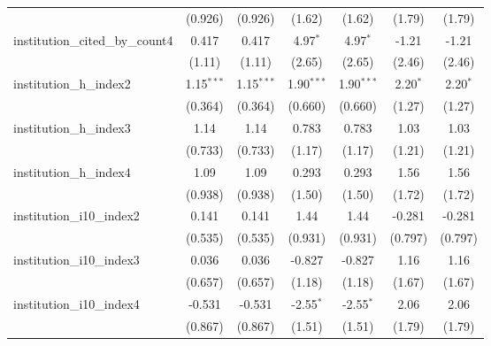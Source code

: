 \begin{tabular}{lcccccc}
                                         & (0.926)       & (0.926)       & (1.62)        & (1.62)        & (1.79)        & (1.79)\\   
   institution\_cited\_by\_count4        & 0.417         & 0.417         & 4.97$^{*}$    & 4.97$^{*}$    & -1.21         & -1.21\\   
                                         & (1.11)        & (1.11)        & (2.65)        & (2.65)        & (2.46)        & (2.46)\\   
   institution\_h\_index2                & 1.15$^{***}$  & 1.15$^{***}$  & 1.90$^{***}$  & 1.90$^{***}$  & 2.20$^{*}$    & 2.20$^{*}$\\   
                                         & (0.364)       & (0.364)       & (0.660)       & (0.660)       & (1.27)        & (1.27)\\   
   institution\_h\_index3                & 1.14          & 1.14          & 0.783         & 0.783         & 1.03          & 1.03\\   
                                         & (0.733)       & (0.733)       & (1.17)        & (1.17)        & (1.21)        & (1.21)\\   
   institution\_h\_index4                & 1.09          & 1.09          & 0.293         & 0.293         & 1.56          & 1.56\\   
                                         & (0.938)       & (0.938)       & (1.50)        & (1.50)        & (1.72)        & (1.72)\\   
   institution\_i10\_index2              & 0.141         & 0.141         & 1.44          & 1.44          & -0.281        & -0.281\\   
                                         & (0.535)       & (0.535)       & (0.931)       & (0.931)       & (0.797)       & (0.797)\\   
   institution\_i10\_index3              & 0.036         & 0.036         & -0.827        & -0.827        & 1.16          & 1.16\\   
                                         & (0.657)       & (0.657)       & (1.18)        & (1.18)        & (1.67)        & (1.67)\\   
   institution\_i10\_index4              & -0.531        & -0.531        & -2.55$^{*}$   & -2.55$^{*}$   & 2.06          & 2.06\\   
                                         & (0.867)       & (0.867)       & (1.51)        & (1.51)        & (1.79)        & (1.79)\\   

\end{tabular}
